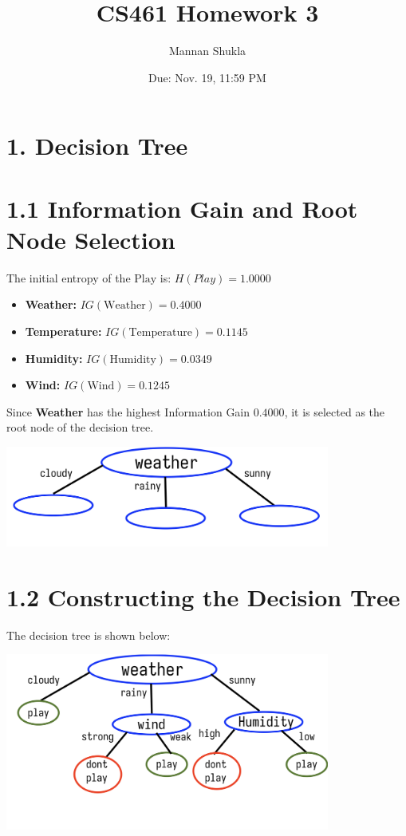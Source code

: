 \documentclass[12pt]{article}
\title{CS461 Homework 3}
\author{Mannan Shukla}
\date{Due: Nov. 19, 11:59 PM}
\begin{document}
\maketitle

\section*{1. Decision Tree}
\section*{1.1 Information Gain and Root Node Selection}

The initial entropy of the $\text{Play}$ is: $H(Play) = 1.0000$

\begin{itemize}
    \item \textbf{Weather:} $IG(\text{Weather}) = 0.4000$
    \item \textbf{Temperature:} $IG(\text{Temperature}) = 0.1145$
    \item \textbf{Humidity:} $IG(\text{Humidity}) = 0.0349$
    \item \textbf{Wind:} $IG(\text{Wind}) = 0.1245$
\end{itemize}

\noindent Since \textbf{Weather} has the highest Information Gain $0.4000$, it is selected as the root node of the decision tree.

\begin{center}
    \includegraphics[width=0.8\textwidth]{1.png}
\end{center}

\section*{1.2 Constructing the Decision Tree}

The decision tree is shown below:

\begin{center}
    \includegraphics[width=0.8\textwidth]{2.png}
\end{center}
\end{document}
